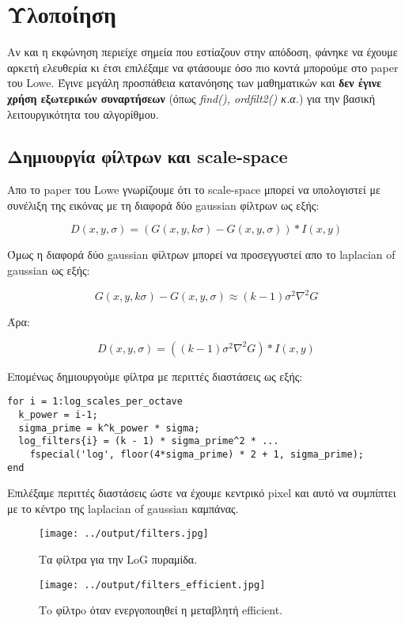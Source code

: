 \documentclass[11pt]{scrartcl} %
\begin{document}
\section{Υλοποίηση}
Αν και η εκφώνηση περιείχε σημεία που εστίαζουν στην απόδοση, φάνηκε να έχουμε αρκετή ελευθερία κι έτσι επιλέξαμε
να φτάσουμε όσο πιο κοντά μπορούμε στο paper του Lowe\cite{lowe}. Έγινε μεγάλη προσπάθεια κατανόησης των μαθηματικών και \textbf{δεν
έγινε χρήση εξωτερικών συναρτήσεων} (όπως \textit{find(), ordfilt2() κ.α.}) για την βασική λειτουργικότητα του αλγορίθμου.

\subsection{Δημιουργία φίλτρων και scale-space}

Απο το paper του Lowe γνωρίζουμε ότι το scale-space μπορεί να υπολογιστεί με συνέλιξη της εικόνας με τη διαφορά δύο gaussian φίλτρων ως εξής:

\[D(x,y,\sigma) = (G(x,y,k\sigma) − G(x,y,\sigma)) * I(x,y)\]

Όμως η διαφορά δύο gaussian φίλτρων μπορεί να προσεγγυστεί απο το laplacian of gaussian ως εξής:

\[G(x,y,k\sigma) − G(x,y,\sigma) \approx (k−1)\sigma^2 \nabla^2 G\]

Άρα:

\[D(x,y,\sigma) = ((k−1)\sigma^2 \nabla^2 G) * I(x,y)\]

Επομένως δημιουργούμε φίλτρα με περιττές διαστάσεις ως εξής:

\begin{verbatim}
for i = 1:log_scales_per_octave
  k_power = i-1;
  sigma_prime = k^k_power * sigma;
  log_filters{i} = (k - 1) * sigma_prime^2 * ...
    fspecial('log', floor(4*sigma_prime) * 2 + 1, sigma_prime);
end
\end{verbatim}

Επιλέξαμε περιττές διαστάσεις ώστε να έχουμε κεντρικό pixel και αυτό να συμπίπτει με το κέντρο της laplacian of gaussian καμπάνας.

\begin{figure}[H]
  \centerline{\texttt{[image: ../output/filters.jpg]}}
  \caption{Τα φίλτρα για την LoG πυραμίδα.}
\end{figure}
\begin{figure}[H]
  \centerline{\texttt{[image: ../output/filters\_efficient.jpg]}}
  \caption{Τo φίλτρo όταν ενεργοποιηθεί η μεταβλητή efficient.}
\end{figure}
\end{document}
